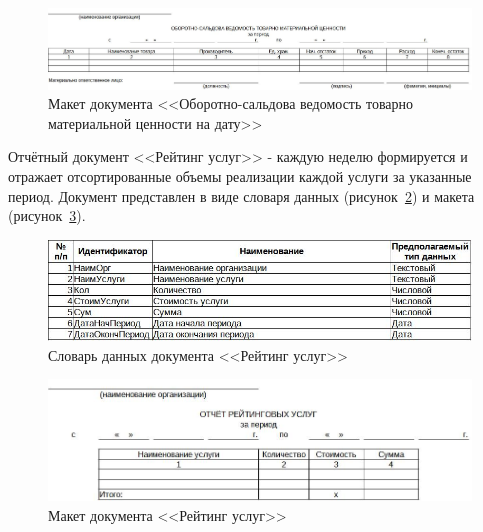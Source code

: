 \documentclass[12pt, a4paper, simple]{eskdtext}
\begin{document}
    \begin{figure}[!h]
        \centering
        \includegraphics[width=14cm]
            {_docs/ОТ_ОборСальдВед_макет.jpg}
        \caption{Макет документа <<Оборотно-сальдова ведомость товарно материальной ценности на дату>>}
        \label{fig:OT_OborSaldVed_maket}
    \end{figure}

    \newpage

    Отчётный документ <<Рейтинг услуг>>
    - каждую неделю формируется и отражает отсортированные объемы реализации каждой услуги за указанные период.
    Документ представлен в виде словаря данных (рисунок~\ref{fig:OT_ReitYslyg_tipi})
    и макета (рисунок~\ref{fig:OT_ReitYslyg_maket}).

    \begin{figure}[!h]
        \centering
        \includegraphics[width=14cm]
            {_docs/ОТ_РейтУслуг_типы.jpg}
        \caption{Словарь данных документа <<Рейтинг услуг>>}
        \label{fig:OT_ReitYslyg_tipi}
    \end{figure}

    \begin{figure}[!h]
        \centering
        \includegraphics[width=14cm]
            {_docs/ОТ_РейтУслуг_макет.jpg}
        \caption{Макет документа <<Рейтинг услуг>>}
        \label{fig:OT_ReitYslyg_maket}
    \end{figure}

    \newpage
\end{document}
